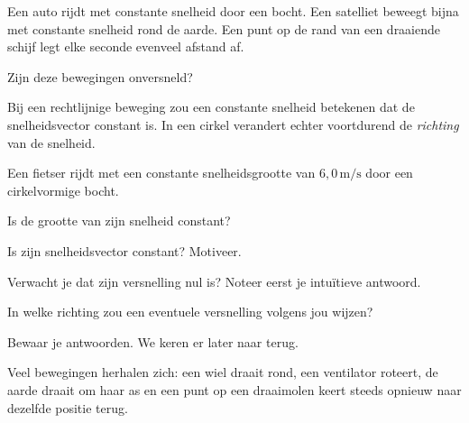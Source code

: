 \documentclass{ximera}
\begin{document}


Een auto rijdt met constante snelheid door een bocht. Een satelliet
beweegt bijna met constante snelheid rond de aarde. Een punt op de rand
van een draaiende schijf legt elke seconde evenveel afstand af.

Zijn deze bewegingen onversneld?

Bij een rechtlijnige beweging zou een constante snelheid betekenen dat
de snelheidsvector constant is. In een cirkel verandert echter
voortdurend de \emph{richting} van de snelheid.

\begin{oefening}{\oefB\ESS}

Een fietser rijdt met een constante snelheidsgrootte van
$6,0\,\mathrm{m/s}$ door een cirkelvormige bocht.

\begin{question}
Is de grootte van zijn snelheid constant?
\end{question}

\begin{question}
Is zijn snelheidsvector constant? Motiveer.
\end{question}

\begin{question}
Verwacht je dat zijn versnelling nul is? Noteer eerst je intuïtieve
antwoord.
\end{question}

\begin{question}
In welke richting zou een eventuele versnelling volgens jou wijzen?
\end{question}

Bewaar je antwoorden. We keren er later naar terug.

\end{oefening}




Veel bewegingen herhalen zich: een wiel draait rond, een ventilator
roteert, de aarde draait om haar as en een punt op een draaimolen keert
steeds opnieuw naar dezelfde positie terug.
\end{document}
